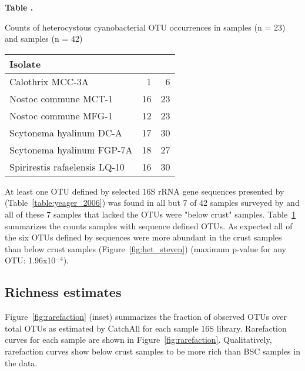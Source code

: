 \begin{table}

\textbf{
    \label{table:het_dist}
    Table .
}
    
    {Counts of heterocystous cyanobacterial OTU occurrences in \citet{Garcia_Pichel_2013} samples (n = 23) and \citet{Steven_2013} samples (n = 42)}

{\centering
\begin{tabular}{lrr}
  \toprule
 Isolate & \citet{Garcia_Pichel_2013} & \citet{Steven_2013} \\ 
  \midrule
Calothrix MCC-3A &   1 &   6 \\ \midrule
Nostoc commune MCT-1 &  16 &  23 \\ \midrule
Nostoc commune MFG-1 &  12 &  23 \\ \midrule
Scytonema hyalinum DC-A &  17 &  30 \\ \midrule
Scytonema hyalinum FGP-7A &  18 &  27 \\ \midrule
Spirirestis rafaelensis LQ-10 &  16 &  30 \\
   \bottomrule
\end{tabular}}{}
\end{table}

At least one OTU defined by selected 16S rRNA gene sequences presented by
\citet{Yeager} (Table~\ref{table:yeager_2006}) was found in all but 7 of 42
samples surveyed by \citet{Steven_2013} and all of these 7 samples that lacked
the \citet{Yeager} OTUs were "below crust" samples. Table~\ref{table:het_dist} summarizes the
counts \citet{Steven_2013} samples with \citet{Yeager} sequence defined OTUs. As expected all of the six OTUs defined by \citet{Yeager} sequences
were more abundant in the crust samples than below crust samples
(Figure~\ref{fig:het_steven}) (maximum p-value for any OTU: 1.96x10$^{-4}$).

\subsection{Richness estimates}
Figure~\ref{fig:rarefaction} (inset) summarizes the fraction of observed OTUs
over total OTUs as estimated by CatchAll for each sample 16S library.
Rarefaction curves for each sample are shown in Figure~\ref{fig:rarefaction}.
Qualitatively, rarefaction curves show below crust samples to be more rich than
BSC samples in the \citet{Steven_2013} data.
